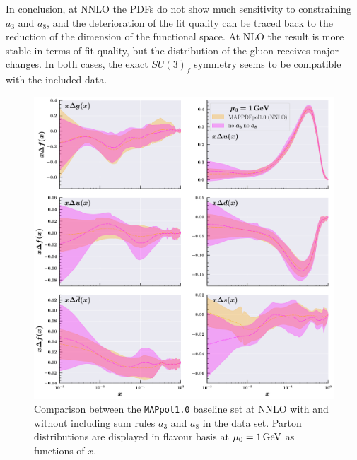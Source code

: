 In conclusion, at NNLO the PDFs do not show much sensitivity to constraining $a_3$ and $a_8$, and the deterioration of the fit quality can be traced back to the reduction of the dimension of the functional space. At NLO the result is more stable in terms of fit quality, but the distribution of the gluon receives major changes. In both cases, the exact $SU(3)_f$ symmetry seems to be compatible with the included data.

\begin{figure}[t!]
  \centering
  \includegraphics[width=\textwidth]{Chapters/Chapter_4/figs/a3_a8_nnlo.pdf}
  \caption{\small{Comparison between the \texttt{MAPpol1.0} baseline set at NNLO with and without including sum rules $a_3$ and $a_8$ in the data set. Parton distributions are displayed in flavour basis at $\mu_0 = 1 \, \textrm{GeV}$ as functions of $x$.}}
  \label{fig:a3_a8_nnlo}
\end{figure}

